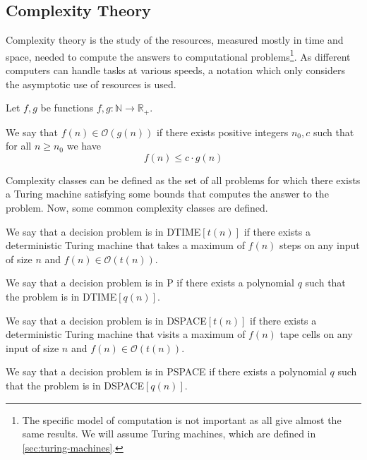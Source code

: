 \subsection{Complexity Theory}\label{subsec:complexity-theory}

Complexity theory is the study of the resources, measured mostly in time and space, needed to compute the answers to computational problems\footnote{The specific model of computation is not important as all give almost the same results. We will assume Turing machines, which are defined in \cref{sec:turing-machines}.}.
As different computers can handle tasks at various speeds, a notation which only considers the asymptotic use of resources is used.

\begin{define}
    Let $f, g$ be functions $f, g: \mathbb{N} \to \mathbb{R}_+$.

    We say that $f(n) \in \mathcal{O}(g(n))$ if there exists positive integers $n_0, c$ such that for all $n \geq n_0$ we have \[f(n) \leq c\cdot g(n)\]
\end{define}

Complexity classes can be defined as the set of all problems for which there exists a Turing machine satisfying some bounds that computes the answer to the problem.
Now, some common complexity classes are defined.

\begin{define}
[{DTIME$[t(n)]$}]
    We say that a decision problem is in DTIME$[t(n)]$ if there exists a deterministic Turing machine that takes a maximum of $f(n)$ steps on any input of size $n$ and $f(n) \in \mathcal{O}(t(n))$.
\end{define}

\begin{define}[P]
    We say that a decision problem is in P if there exists a polynomial $q$ such that the problem is in DTIME$[q(n)]$.
\end{define}

\begin{define}
[{DSPACE$[t(n)]$}]
    We say that a decision problem is in DSPACE$[t(n)]$ if there exists a deterministic Turing machine that visits a maximum of $f(n)$ tape cells on any input of size $n$ and $f(n) \in \mathcal{O}(t(n))$.
\end{define}

\begin{define}[PSPACE]
    We say that a decision problem is in PSPACE if there exists a polynomial $q$ such that the problem is in DSPACE$[q(n)]$.
\end{define}

